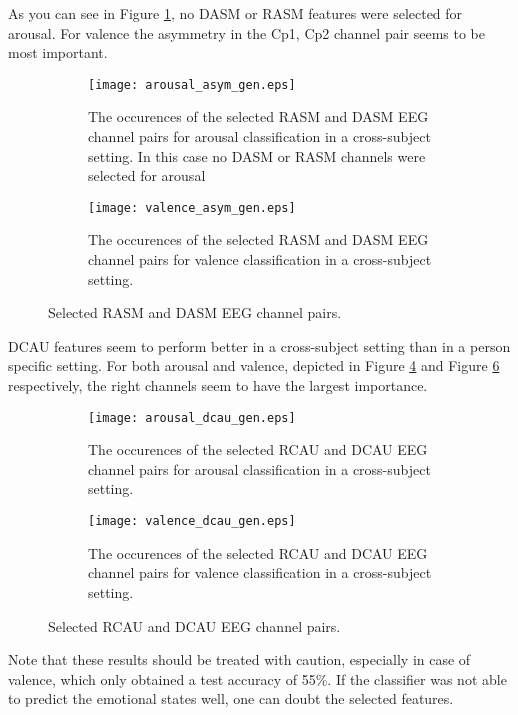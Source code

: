 As you can see in Figure \ref{arousalasym_gen}, no DASM or RASM features were selected for arousal. For valence the asymmetry in the Cp1, Cp2 channel pair seems to be most important.

\begin{figure}[H]
\centering
  \begin{subfigure}[b]{.4\textwidth}
    \texttt{[image: arousal\_asym\_gen.eps]}
    \caption{The occurences of the selected RASM and DASM EEG channel pairs for arousal classification in a cross-subject setting. In this case no DASM or RASM channels were selected for arousal\label{arousalasym_gen}}
  \end{subfigure}
\hfill
  \begin{subfigure}[b]{.4\textwidth}
    \texttt{[image: valence\_asym\_gen.eps]}
    \caption{The occurences of the selected RASM and DASM EEG channel pairs for valence classification in a cross-subject setting.\label{valenceasym_gen}}
  \end{subfigure}
\caption{Selected RASM and DASM EEG channel pairs.}
\end{figure}

DCAU features seem to perform better in a cross-subject setting than in a person specific setting. For both arousal and valence, depicted in Figure \ref{arousaldcau_gen} and Figure \ref{valencedcau_gen} respectively, the right channels seem to have the largest importance.

\begin{figure}[H]
\centering
  \begin{subfigure}[b]{.4\textwidth}
    \texttt{[image: arousal\_dcau\_gen.eps]}
    \caption{The occurences of the selected RCAU and DCAU EEG channel pairs for arousal classification in a cross-subject setting.\label{arousaldcau_gen}}
  \end{subfigure}
\hfill
  \begin{subfigure}[b]{.4\textwidth}
    \texttt{[image: valence\_dcau\_gen.eps]}
    \caption{The occurences of the selected RCAU and DCAU EEG channel pairs for valence classification in a cross-subject setting.\label{valencedcau_gen}}
  \end{subfigure}
\caption{Selected RCAU and DCAU EEG channel pairs.}
\end{figure}

Note that these results should be treated with caution, especially in case of valence, which only obtained a test accuracy of 55\%. If the classifier was not able to predict the emotional states well, one can doubt the selected features. 

